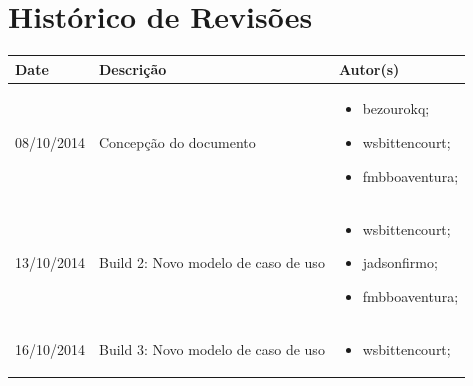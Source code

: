 \documentclass{article}
\begin{document}

\capa
\newpage

\section*{\center Histórico de Revisões}
  \vspace*{1cm}
  \begin{table}[ht]
    \centering
    \begin{tabular}[pos]{|m{2cm} | m{7.2cm} | m{3.8cm}|} 
      \hline
      \cellcolor[gray]{0.9}
      \textbf{Date} & \cellcolor[gray]{0.9}\textbf{Descrição} & \cellcolor[gray]{0.9}\textbf{Autor(s)}\\ \hline
      \hline
      \small 08/10/2014 & \small Concepção do documento & \small 
      \begin{itemize}
      	\item bezourokq;
      	\item wsbittencourt;
      	\item fmbboaventura;  
	  \end{itemize}      	
      \\ \hline
      \small 13/10/2014 & \small Build 2: Novo modelo de caso de uso & \small 
      \begin{itemize}
      	\item wsbittencourt;
      	\item jadsonfirmo;
      	\item fmbboaventura;  
	  \end{itemize}      	
      \\ \hline
      \small 16/10/2014 & \small Build 3: Novo modelo de caso de uso & \small 
      \begin{itemize}
      	\item wsbittencourt; 
	  \end{itemize}  
	  \\ \hline
    \end{tabular}
  \end{table}

\newpage

\tableofcontents
\newpage

\end{document}
